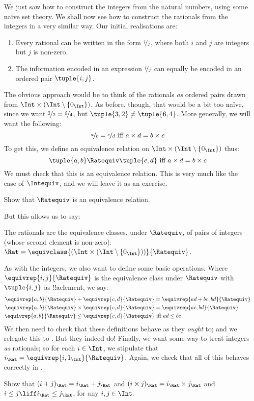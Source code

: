 \documentclass[../../../include/open-logic-section]{subfiles}
\begin{document}

We just saw how to construct the integers from the natural numbers,
using some na\"{i}ve set theory. We shall now see how to construct the
rationals from the integers in a very similar way. Our initial
realisations are:
\begin{enumerate}
	\item Every rational can be written in the form $\nicefrac{i}{j}$,
	where both $i$ and $j$ are integers but $j$ is non-zero.
	\item The information encoded in an expression $\nicefrac{i}{j}$
	can equally be encoded in an ordered pair $\tuple{ i, j}$.
\end{enumerate}
The obvious approach would be to think of the rationals \emph{as}
ordered pairs drawn from $\Int \times (\Int \setminus \{0_\Int\})$. As
before, though, that would be a bit too na\"ive, since we want
$\nicefrac{3}{2} = \nicefrac{6}{4}$, but $\tuple{ 3, 2}\neq \tuple{ 6,
4}$. More generally, we will want the following:
\[
	\nicefrac{a}{b} = \nicefrac{c}{d} \text{ iff } a \times d = b \times c
\]
To get this, we define an {equivalence relation} on  $\Int \times
(\Int \setminus \{0_\Int\})$ thus:
\[
	\tuple{ a, b }\Ratequiv \tuple{ c, d} \text{ iff }a \times d = b \times c
\]
We must check that this is an equivalence relation. This is very much
like the case of $\Intequiv$, and we will leave it as an exercise. 

\begin{prob}
Show that $\Ratequiv$ is an equivalence relation.
\end{prob}

But this allows us to say:
\begin{defn}
The rationals are the equivalence classes, under $\Ratequiv$, of pairs
of integers (whose second element is non-zero):  $\Rat =
\equivclass{(\Int \times (\Int\setminus \{0_\Int\}))}{\Ratequiv}$.
\end{defn}

As with the integers, we also want to define some basic operations.
Where $\equivrep{i,j}{\Ratequiv}$ is the equivalence class under
$\Ratequiv$ with $\tuple{ i, j}$ as !!a{element}, we say:
\begin{align*}
	\equivrep{a, b}{\Ratequiv} + \equivrep{c, d}{\Ratequiv} &= \equivrep{ad + bc,  bd}{\Ratequiv}\\
	\equivrep{a, b}{\Ratequiv} \times \equivrep{c, d}{\Ratequiv} &= \equivrep{a  c, b d}{\Ratequiv}\\
	\equivrep{a, b}{\Ratequiv} \leq \equivrep{c, d}{\Ratequiv} &\text{ iff }ad \leq bc
\end{align*}
We then need to check that these definitions behave as they
\emph{ought} to; and we relegate this to . But they
indeed do!{} Finally, we want some way to treat integers \emph{as}
rationals; so for each $i \in \Int$, we stipulate that $i_\Rat =
\equivrep{i, 1_\Int}{\Ratequiv}$. Again, we check that all of this
behaves correctly in .

\begin{prob}
Show that $(i + j)_\Rat = i_\Rat+ j_\Rat$ and $(i \times j)_\Rat =
i_\Rat \times j_\Rat$ and $i \leq j \liff i_\Rat \leq j_\Rat$, for any
$i, j \in \Int$.
\end{prob}
\end{document}
